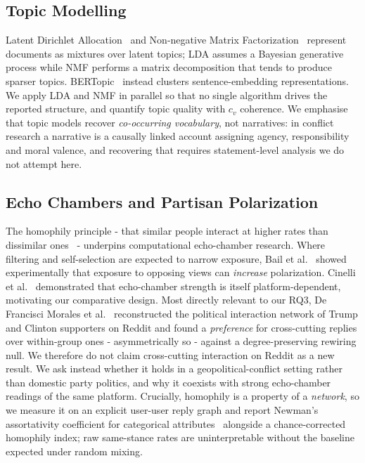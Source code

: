 \documentclass[10pt,twocolumn]{article}
\begin{document}
\subsection{Topic Modelling}
Latent Dirichlet Allocation~\cite{blei2003} and Non-negative Matrix
Factorization~\cite{leeseung2000} represent documents as mixtures over latent
topics; LDA assumes a Bayesian generative process while NMF performs a matrix
decomposition that tends to produce sparser topics. BERTopic~\cite{grootendorst2022}
instead clusters sentence-embedding representations. We apply LDA and NMF in
parallel so that no single algorithm drives the reported structure, and quantify
topic quality with $c_v$ coherence. We emphasise
that topic models recover \emph{co-occurring vocabulary}, not narratives: in conflict
research a narrative is a causally linked account assigning agency, responsibility
and moral valence, and recovering that requires statement-level analysis we do not
attempt here.

\subsection{Echo Chambers and Partisan Polarization}
The homophily principle - that similar people interact at higher rates than
dissimilar ones~\cite{newman2003} - underpins computational echo-chamber
research. Where filtering and self-selection are expected to narrow exposure,
Bail et al.~\cite{bail2018} showed experimentally that
exposure to opposing views can \emph{increase} polarization. Cinelli
et al.~\cite{cinelli2021} demonstrated that echo-chamber strength is itself
platform-dependent, motivating our comparative design. Most directly relevant to
our RQ3, De Francisci Morales et al.~\cite{defrancisci2021} reconstructed the
political interaction network of Trump and Clinton supporters on Reddit and found a
\emph{preference} for cross-cutting replies over within-group ones - asymmetrically
so - against a degree-preserving rewiring null. We therefore do not claim
cross-cutting interaction on Reddit as a new result. We ask instead whether it holds
in a geopolitical-conflict setting rather than domestic party politics, and why it
coexists with strong echo-chamber readings of the same platform. Crucially, homophily is a
property of a \emph{network}, so we measure it on an explicit user-user reply graph
and report Newman's assortativity coefficient for categorical
attributes~\cite{newman2003} alongside a chance-corrected homophily index; raw
same-stance rates are uninterpretable without the baseline expected under random
mixing.
\end{document}
